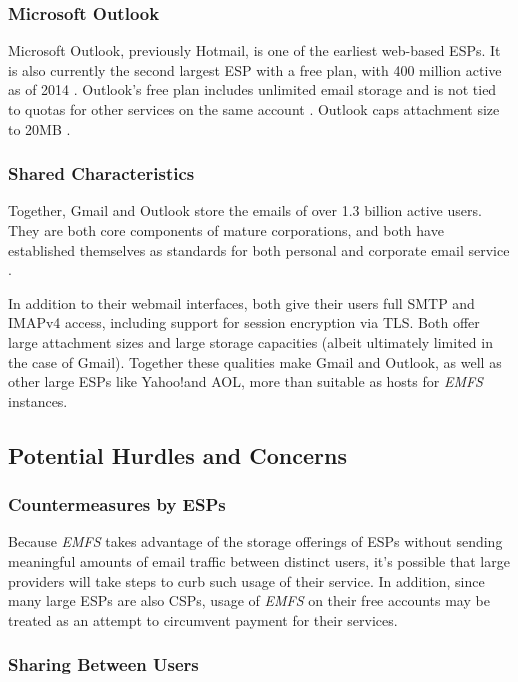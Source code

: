 \documentclass[12pt]{article}
\begin{document}
\subsubsection{Microsoft Outlook}

Microsoft Outlook, previously Hotmail, is one of the earliest web-based
ESPs. It is also currently the second largest ESP with a free plan, with 400
million active as of 2014 \cite{microsoft:02}. Outlook's free plan includes
unlimited email storage and is not tied to quotas for other services on the same
account \cite{microsoft:03}. Outlook caps attachment size to 20MB
\cite{microsoft:01}.

\subsubsection{Shared Characteristics}

Together, Gmail and Outlook store the emails of over 1.3 billion active users.
They are both core components of mature corporations, and both have
established themselves as standards for both personal and corporate email
service \cite{frommer:01}.

In addition to their webmail interfaces, both give their users full SMTP and
IMAPv4 access, including support for session encryption via TLS. Both offer
large attachment sizes and large storage capacities (albeit ultimately limited
in the case of Gmail). Together these qualities make Gmail and Outlook, as
well as other large ESPs like Yahoo!\@ and AOL, more than suitable as hosts
for \textit{EMFS} instances.

\subsection{Potential Hurdles and Concerns}

\subsubsection{Countermeasures by ESPs}

Because \textit{EMFS} takes advantage of the storage offerings of ESPs without
sending meaningful amounts of email traffic between distinct users, it's
possible that large providers will take steps to curb such usage of their
service. In addition, since many large ESPs are also CSPs, usage of
\textit{EMFS} on their free accounts may be treated as an attempt to circumvent
payment for their services.

\subsubsection{Sharing Between Users}
\end{document}
